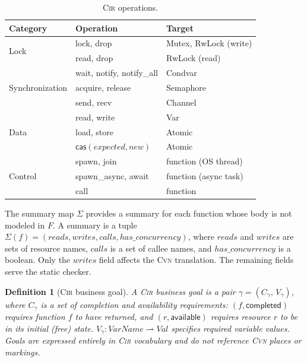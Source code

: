 \documentclass{article}
\newtheorem{definition}{Definition}
\begin{document}
\begin{table}[h]
\caption{\textsc{Cir} operations.}
\label{tab:cir-ops}
\centering\footnotesize
\begin{tabular}{@{}llp{3.2cm}@{}}
\toprule
\textbf{Category} & \textbf{Operation} & \textbf{Target} \\
\midrule
\multirow{2}{*}{Lock}
  & \textsf{lock}, \textsf{drop}
  & Mutex, RwLock (write) \\
  & \textsf{read}, \textsf{drop}
  & RwLock (read) \\[3pt]
\multirow{3}{*}{Synchronization}
  & \textsf{wait}, \textsf{notify}, \textsf{notify\_all}
  & Condvar \\
  & \textsf{acquire}, \textsf{release}
  & Semaphore \\
  & \textsf{send}, \textsf{recv}
  & Channel \\[3pt]
\multirow{3}{*}{Data}
  & \textsf{read}, \textsf{write}
  & Var \\
  & \textsf{load}, \textsf{store}
  & Atomic \\
  & $\textsf{cas}(\mathit{expected},\mathit{new})$
  & Atomic \\[3pt]
\multirow{3}{*}{Control}
  & \textsf{spawn}, \textsf{join}
  & function (OS thread) \\
  & \textsf{spawn\_async}, \textsf{await}
  & function (async task) \\
  & \textsf{call}
  & function \\
\bottomrule
\end{tabular}
\end{table}

The summary map $\Sigma$ provides a summary for each function whose
body is not modeled in $F$.  A summary is a tuple
$\Sigma(f)=(\mathit{reads},\mathit{writes},\mathit{calls},
\mathit{has\_concurrency})$, where $\mathit{reads}$ and
$\mathit{writes}$ are sets of resource names, $\mathit{calls}$ is a
set of callee names, and $\mathit{has\_concurrency}$ is a boolean.
Only the $\mathit{writes}$ field affects the \textsc{Cvn} translation.
The remaining fields serve the static checker.

\begin{definition}[\textsc{Cir} business goal]
\label{def:cir-goal}
A \textsc{Cir} business goal is a pair $\gamma=(C_\gamma,\,V_\gamma)$,
where $C_\gamma$ is a set of \emph{completion} and \emph{availability}
requirements: $(f,\textsf{completed})$ requires function $f$ to have
returned, and $(r,\textsf{available})$ requires resource $r$ to be in
its initial (free) state.
$V_\gamma:\mathit{VarName}\rightharpoonup\mathit{Val}$ specifies
required variable values.  Goals are expressed entirely in \textsc{Cir}
vocabulary and do not reference \textsc{Cvn} places or markings.
\end{definition}
\end{document}
